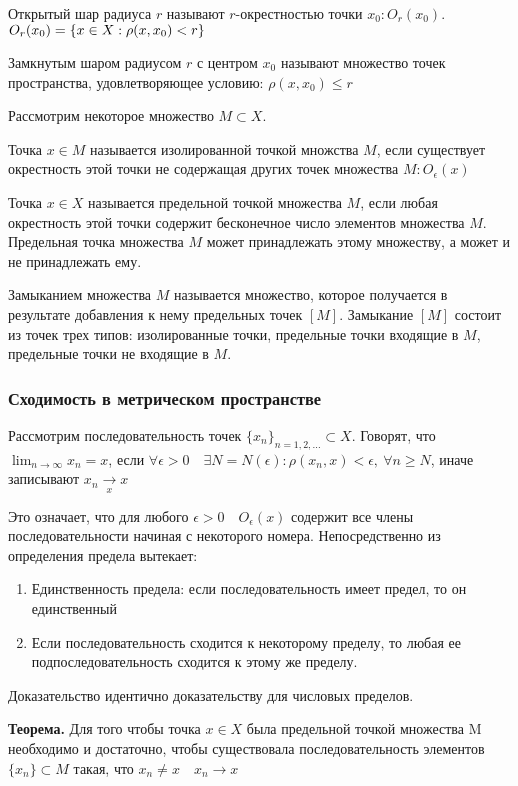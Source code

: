 \documentclass[12pt]{report}
\newcommand{\be}{\begin{enumerate}}
\newcommand{\ee}{\end{enumerate}}
\renewcommand{\[}{$\\\displaystyle}
\renewcommand{\]}{\\$}
\renewcommand{\[}{$\\\displaystyle}
\newcommand{\sep}{,\ }
\newcommand{\tth}[1][]{\textbf{Теорема#1.}}
\begin{document}
Открытый шар радиуса $r$ называют $r$-окрестностью точки $x_0: O_r(x_0)$.
\[
  O_r(x_0) = \{x \in X: \rho(x, x_0) < r\}
\]

Замкнутым шаром радиусом $r$ с центром $x_0$ называют множество точек пространства, удовлетворяющее условию: $\rho(x, x_0) \leq r$

Рассмотрим некоторое множество $M \subset X$.

Точка $x \in M$ называется изолированной точкой множства $M$, если существует окрестность этой точки не содержащая других точек множества $M: O_\epsilon(x)$

Точка $x \in X$ называется предельной точкой множества $M$, если любая окрестность этой точки содержит бесконечное число элементов множества $M$. Предельная точка множества $M$ может принадлежать этому множеству, а может и не принадлежать ему.

Замыканием множества $M$ называется множество, которое получается в результате добавления к нему предельных точек $[M]$. Замыкание $[M]$ состоит из точек трех типов: изолированные точки, предельные точки входящие в $M$, предельные точки не входящие в $M$.

\subsubsection{Сходимость в метрическом пространстве}

Рассмотрим последовательность точек $\{x_n\}_{n=1,2,\dots}\subset X$. Говорят, что $\lim_{n \rightarrow \infty} x_n = x$, если $\forall \epsilon > 0\quad \exists N = N(\epsilon): \rho(x_n, x)<\epsilon\sep\forall n \geq N$, иначе записывают $x_n\xrightarrow[x]{}x$

Это означает, что для любого $\epsilon > 0 \quad O_\epsilon(x)$ содержит все члены последовательности начиная с некоторого номера. Непосредственно из определения предела вытекает:

\be
  \item Единственность предела: если последовательность имеет предел, то он единственный

  \item Если последовательность сходится к некоторому пределу, то любая ее подпоследовательность сходится к этому же пределу.
\ee

Доказательство идентично доказательству для числовых пределов.

\tth[] Для того чтобы точка $x \in X$ была предельной точкой множества M необходимо и достаточно, чтобы существовала последовательность элементов $\{x_n\}\subset M$ такая, что $x_n\neq x\quad x_n\rightarrow x$
\end{document}
